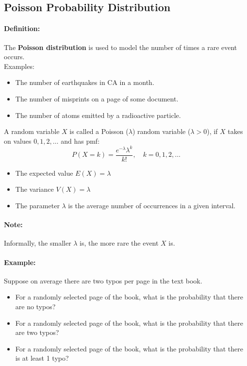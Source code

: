 \subsection{Poisson Probability Distribution}
\hrulefill
\paragraph*{Definition:}
The \textbf{Poisson distribution} is used to model the number of times a rare event occurs.\\
Examples:
\begin{itemize}
    \item The number of earthquakes in CA in a month.
    \item The number of misprints on a page of some document.
    \item The number of atoms emitted by a radioactive particle.
\end{itemize}

A random variable $X$ is called a Poisson ($\lambda$) random variable ($\lambda > 0$), if $X$ takes
on values $0,1,2,\dots$ and has pmf:
\[
    P(X=k) = \frac{e^{-\lambda} \lambda^k}{k!}, \quad k=0,1,2,\dots
\]
\begin{itemize}
    \item The expected value $E(X) = \lambda$
    \item The variance $V(X) = \lambda$
    \item The parameter $\lambda$ is the average number of occurrences in a given interval.
\end{itemize}

\paragraph*{Note:}
Informally, the smaller $\lambda$ is, the more rare the event $X$ is.

\paragraph*{Example:}
Suppose on average there are two typos per page in the text book.
\begin{itemize}
    \item For a randomly selected page of the book, what is the probability that there are no typos?
    \item For a randomly selected page of the book, what is the probability that there are two typos?
    \item For a randomly selected page of the book, what is the probability that there is at least 1 typo?
\end{itemize}

